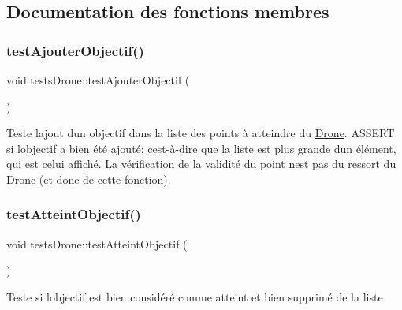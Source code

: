 \subsection{Documentation des fonctions membres}
\mbox{\label{classtests_drone_add1f7248206bee9d8e61ec4b2cd0731e}} 
\subsubsection{\texorpdfstring{test\+Ajouter\+Objectif()}{testAjouterObjectif()}}
{\footnotesize\ttfamily void tests\+Drone\+::test\+Ajouter\+Objectif (\begin{DoxyParamCaption}{ }\end{DoxyParamCaption})\hspace{0.3cm}{\ttfamily [protected]}}

Teste l\textquotesingle{}ajout d\textquotesingle{}un objectif dans la liste des points à atteindre du \mbox{\hyperlink{class_drone}{Drone}}. A\+S\+S\+E\+RT si l\textquotesingle{}objectif a bien été ajouté; c\textquotesingle{}est-\/à-\/dire que la liste est plus grande d\textquotesingle{}un élément, qui est celui affiché. La vérification de la validité du point n\textquotesingle{}est pas du ressort du \mbox{\hyperlink{class_drone}{Drone}} (et donc de cette fonction). \mbox{\label{classtests_drone_a3da2718fb45f6636f5f2d7c79030b418}} 
\subsubsection{\texorpdfstring{test\+Atteint\+Objectif()}{testAtteintObjectif()}}
{\footnotesize\ttfamily void tests\+Drone\+::test\+Atteint\+Objectif (\begin{DoxyParamCaption}{ }\end{DoxyParamCaption})\hspace{0.3cm}{\ttfamily [protected]}}

Teste si l\textquotesingle{}objectif est bien considéré comme atteint et bien supprimé de la liste \mbox{\label{classtests_drone_a6d3911d99922bf1a46f5209c66abe963}} 
